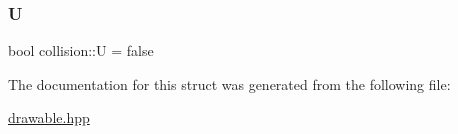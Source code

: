 \mbox{\label{structcollision_a01f73e208a2d2c858a157ab895a58509}} 
\subsubsection{\texorpdfstring{U}{U}}
{\footnotesize\ttfamily bool collision\+::U = false}



The documentation for this struct was generated from the following file\+:\begin{DoxyCompactItemize}
\item 
\hyperlink{drawable_8hpp}{drawable.\+hpp}\end{DoxyCompactItemize}
